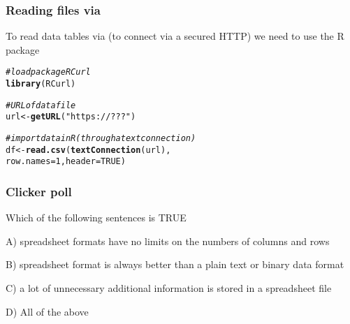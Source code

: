 \documentclass[12pt]{beamer}\usepackage[]{graphicx}\usepackage[]{color}
\makeatletter
\newcommand{\hlnum}[1]{\textcolor[rgb]{0.686,0.059,0.569}{#1}}%
\newcommand{\hlstr}[1]{\textcolor[rgb]{0.192,0.494,0.8}{#1}}%
\newcommand{\hlcom}[1]{\textcolor[rgb]{0.678,0.584,0.686}{\textit{#1}}}%
\newcommand{\hlstd}[1]{\textcolor[rgb]{0.345,0.345,0.345}{#1}}%
\newcommand{\hlkwb}[1]{\textcolor[rgb]{0.69,0.353,0.396}{#1}}%
\newcommand{\hlkwc}[1]{\textcolor[rgb]{0.333,0.667,0.333}{#1}}%
\newcommand{\hlkwd}[1]{\textcolor[rgb]{0.737,0.353,0.396}{\textbf{#1}}}%
\newenvironment{kframe}{%
 \def\at@end@of@kframe{}%
 \ifinner\ifhmode%
  \def\at@end@of@kframe{\end{minipage}}%
  \begin{minipage}{\columnwidth}%
 \fi\fi%
 \def\FrameCommand##1{\hskip\@totalleftmargin \hskip-\fboxsep
 \colorbox{shadecolor}{##1}\hskip-\fboxsep
     \hskip-\linewidth \hskip-\@totalleftmargin \hskip\columnwidth}%
 \MakeFramed {\advance\hsize-\width
   \@totalleftmargin\z@ \linewidth\hsize
   \@setminipage}}%
 {\par\unskip\endMakeFramed%
 \at@end@of@kframe}
\newenvironment{knitrout}{}{} %
\makeatother
\begin{document}
\begin{frame}[fragile]
\frametitle{Reading files via }

To read data tables via  (to connect via a secured HTTP) we need to use the R package 
\begin{knitrout}\footnotesize
{}\color{fgcolor}\begin{kframe}
\begin{alltt}
\hlcom{# load package RCurl}
\hlkwd{library}\hlstd{(RCurl)}

\hlcom{# URL of data file}
\hlstd{url} \hlkwb{<-} \hlkwd{getURL}\hlstd{(}\hlstr{"https://???"}\hlstd{)}

\hlcom{# import data in R (through a text connection)}
\hlstd{df} \hlkwb{<-} \hlkwd{read.csv}\hlstd{(}\hlkwd{textConnection}\hlstd{(url),}
               \hlkwc{row.names} \hlstd{=} \hlnum{1}\hlstd{,} \hlkwc{header} \hlstd{=} \hlnum{TRUE}\hlstd{)}
\end{alltt}
\end{kframe}
\end{knitrout}

\end{frame}


\begin{frame}
\frametitle{Clicker poll}

Which of the following sentences is TRUE \\
\bi
  \item[A)] spreadsheet formats have no limits on the numbers of columns and rows
  \item[B)] spreadsheet format is always better than a plain text or binary data format
  \item[C)] a lot of unnecessary additional information is stored in a spreadsheet file
  \item[D)] All of the above
\ei

\end{frame}


\begin{frame}
\begin{center}
\Huge{}
\end{center}
\end{frame}

\end{document}
